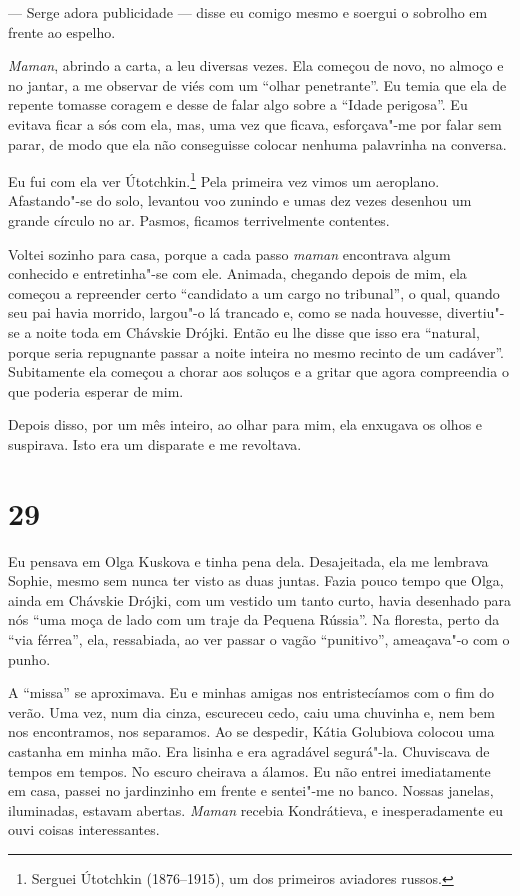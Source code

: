--- Serge adora publicidade --- disse eu comigo mesmo e soergui o
sobrolho em frente ao espelho.

\emph{Maman}, abrindo a carta, a leu diversas vezes. Ela começou de
novo, no almoço e no jantar, a me observar de viés com um ``olhar
penetrante''. Eu temia que ela de repente tomasse coragem e desse de
falar algo sobre a ``Idade perigosa''. Eu evitava ficar a sós com ela,
mas, uma vez que ficava, esforçava"-me por falar sem parar, de modo que
ela não conseguisse colocar nenhuma palavrinha na conversa.

Eu fui com ela ver Útotchkin.\footnote{Serguei Útotchkin (1876--1915),
  um dos primeiros aviadores russos.} Pela primeira vez vimos um
aeroplano. Afastando"-se do solo, levantou voo zunindo e umas dez vezes
desenhou um grande círculo no ar. Pasmos, ficamos terrivelmente
contentes.

Voltei sozinho para casa, porque a cada passo \emph{maman} encontrava
algum conhecido e entretinha"-se com ele. Animada, chegando depois de
mim, ela começou a repreender certo ``candidato a um cargo no
tribunal'', o qual, quando seu pai havia morrido, largou"-o lá trancado
e, como se nada houvesse, divertiu"-se a noite toda em Chávskie Drójki.
Então eu lhe disse que isso era ``natural, porque seria repugnante
passar a noite inteira no mesmo recinto de um cadáver''. Subitamente ela
começou a chorar aos soluços e a gritar que agora compreendia o que
poderia esperar de mim.

Depois disso, por um mês inteiro, ao olhar para mim, ela enxugava os
olhos e suspirava. Isto era um disparate e me revoltava.

\section{29}

Eu pensava em Olga Kuskova e tinha pena dela. Desajeitada, ela me
lembrava Sophie, mesmo sem nunca ter visto as duas juntas. Fazia pouco
tempo que Olga, ainda em Chávskie Drójki, com um vestido um tanto curto,
havia desenhado para nós ``uma moça de lado com um traje da Pequena
Rússia''. Na floresta, perto da ``via férrea'', ela, ressabiada, ao ver
passar o vagão ``punitivo'', ameaçava"-o com o punho.

A ``missa'' se aproximava. Eu e minhas amigas nos entristecíamos com o
fim do verão. Uma vez, num dia cinza, escureceu cedo, caiu uma chuvinha
e, nem bem nos encontramos, nos separamos. Ao se despedir, Kátia
Golubiova colocou uma castanha em minha mão. Era lisinha e era agradável
segurá"-la. Chuviscava de tempos em tempos. No escuro cheirava a álamos.
Eu não entrei imediatamente em casa, passei no jardinzinho em frente e
sentei"-me no banco. Nossas janelas, iluminadas, estavam abertas.
\emph{Maman} recebia Kondrátieva, e inesperadamente eu ouvi coisas
interessantes.

